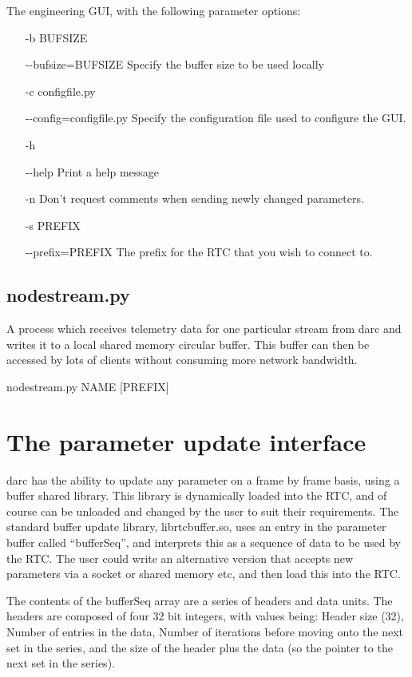 \documentclass[a4,10pt]{article}
\begin{document}
The engineering GUI, with the following parameter options:
\begin{itemize}
\item[-b BUFSIZE]
\item[-{-}bufsize=BUFSIZE] Specify the buffer size to be
  used locally
\item[-c configfile.py]
\item[-{-}config=configfile.py] Specify the
  configuration file used to configure the GUI.
\item[-h]
\item[-{-}help] Print a help message
\item[-n] Don't request comments when sending newly changed
  parameters.
\item[-s PREFIX]
\item[-{-}prefix=PREFIX] The prefix for the RTC that you
  wish to connect to.
\end{itemize}


\subsection{nodestream.py}
A process which receives telemetry data for one particular stream from
darc and writes it to a local shared memory circular buffer.  This
buffer can then be accessed by lots of clients without consuming more
network bandwidth.

nodestream.py NAME [PREFIX]




\section{The parameter update interface}
darc has the ability to update any parameter on a frame by frame
basis, using a buffer shared library.  This library is dynamically
loaded into the RTC, and of course can be unloaded and changed by the
user to suit their requirements.  The standard buffer update library,
librtcbuffer.so, uses an entry in the parameter buffer called
``bufferSeq'', and interprets this as a sequence of data to be used by
the RTC.  The user could write an alternative version that accepts new
parameters via a socket or shared memory etc, and then load this into
the RTC.

The contents of the bufferSeq array are a series of headers and data
units.  The headers are composed of four 32 bit integers, with values
being: Header size (32), Number of entries in the data, Number of
iterations before moving onto the next set in the series, and the size
of the header plus the data (so the pointer to the next set in the
series).
\end{document}

